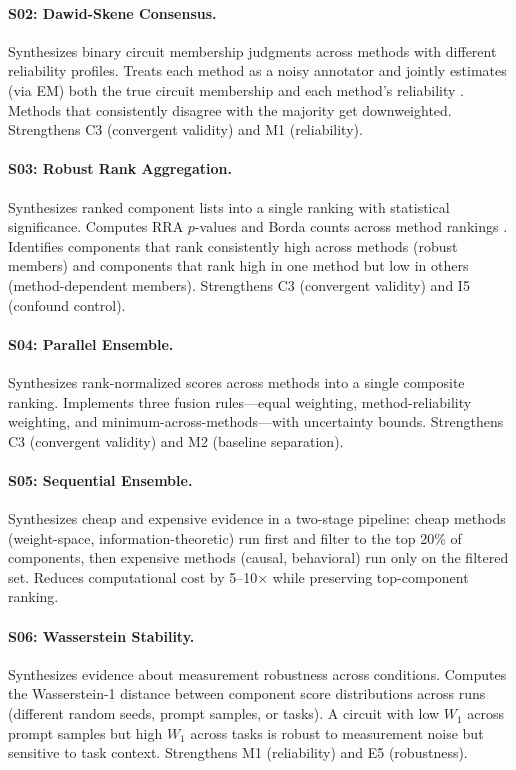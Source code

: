 \documentclass{article}
\begin{document}
\paragraph{S02: Dawid-Skene Consensus.} Synthesizes binary circuit membership judgments across methods with different reliability profiles. Treats each method as a noisy annotator and jointly estimates (via EM) both the true circuit membership and each method's reliability \citep{dawid1979maximum}. Methods that consistently disagree with the majority get downweighted. Strengthens C3 (convergent validity) and M1 (reliability).

\paragraph{S03: Robust Rank Aggregation.} Synthesizes ranked component lists into a single ranking with statistical significance. Computes RRA $p$-values and Borda counts across method rankings \citep{kolde2012robust}. Identifies components that rank consistently high across methods (robust members) and components that rank high in one method but low in others (method-dependent members). Strengthens C3 (convergent validity) and I5 (confound control).

\paragraph{S04: Parallel Ensemble.} Synthesizes rank-normalized scores across methods into a single composite ranking. Implements three fusion rules---equal weighting, method-reliability weighting, and minimum-across-methods---with uncertainty bounds. Strengthens C3 (convergent validity) and M2 (baseline separation).

\paragraph{S05: Sequential Ensemble.} Synthesizes cheap and expensive evidence in a two-stage pipeline: cheap methods (weight-space, information-theoretic) run first and filter to the top 20\% of components, then expensive methods (causal, behavioral) run only on the filtered set. Reduces computational cost by 5--10$\times$ while preserving top-component ranking.

\paragraph{S06: Wasserstein Stability.} Synthesizes evidence about measurement robustness across conditions. Computes the Wasserstein-1 distance between component score distributions across runs (different random seeds, prompt samples, or tasks). A circuit with low $W_1$ across prompt samples but high $W_1$ across tasks is robust to measurement noise but sensitive to task context. Strengthens M1 (reliability) and E5 (robustness).
\end{document}
